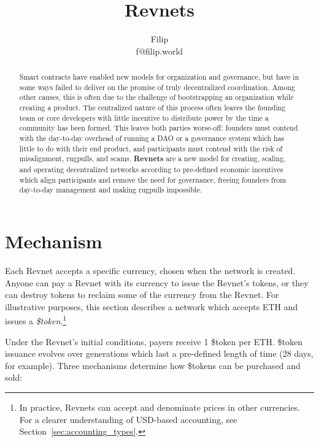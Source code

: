 \documentclass{article}
\title{Revnets}
\author{Filip\\f@filip.world}
\begin{document}
\maketitle

\begin{abstract}
  Smart contracts have enabled new models for organization and governance, but have in some ways failed to deliver on the promise of truly decentralized coordination. Among other causes, this is often due to the challenge of bootstrapping an organization while creating a product. The centralized nature of this process often leaves the founding team or core developers with little incentive to distribute power by the time a community has been formed. This leaves both parties worse-off: founders must contend with the day-to-day overhead of running a DAO or a governance system which has little to do with their end product, and participants must contend with the risk of misalignment, rugpulls, and scams. \textbf{Revnets} are a new model for creating, scaling, and operating decentralized networks according to pre-defined economic incentives which align participants and remove the need for governance, freeing founders from day-to-day management and making rugpulls impossible.
\end{abstract}

\section{Mechanism}

Each Revnet accepts a specific currency, chosen when the network is created. Anyone can pay a Revnet with its currency to issue the Revnet's tokens, or they can destroy tokens to reclaim some of the currency from the Revnet. For illustrative purposes, this section describes a network which accepts ETH and issues a \textit{\$token}.\footnote{In practice, Revnets can accept and denominate prices in other currencies. For a clearer understanding of USD-based accounting, see Section~\ref{sec:accounting_types}.}

Under the Revnet's initial conditions, payers receive 1 \$token per ETH. \$token issuance evolves over generations which last a pre-defined length of time (28 days, for example). Three mechanisms determine how \$tokens can be purchased and sold:
\end{document}

